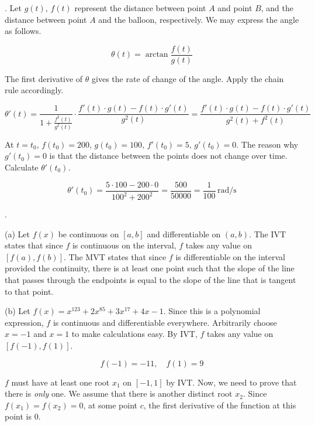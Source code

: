 \documentclass{article}
\begin{document}
\hfill

. Let $g(t),\,f(t)$ represent the distance between point $A$ and point $B$, and the distance between point $A$ and the balloon, respectively. We may express the angle as follows.

\[\theta(t)=\arctan{\frac{f(t)}{g(t)}}\]

\hfill

\noindent The first derivative of $\theta$ gives the rate of change of the angle. Apply the chain rule accordingly.

\[\theta'(t)=\frac1{\displaystyle 1+\frac{f^2(t)}{g^2(t)}}\cdot\frac{f'(t)\cdot g(t) - f(t) \cdot g'(t)}{g^2(t)}=\frac{f'(t)\cdot g(t) - f(t) \cdot g'(t)}{g^2(t)+f^2(t)}\]

\hfill

\noindent At $t=t_0$, $f(t_0)= 200,\,g(t_0) =100,\,f'(t_0)=5,\,g'(t_0) = 0$. The reason why $g'(t_0) = 0$ is that the distance between the points does not change over time. Calculate $\theta'(t_0)$.

\[\theta'(t_0)=\frac{5\cdot 100 - 200 \cdot 0}{100^2+200^2}=\frac{500}{50000}=\boxed{\frac1{100}\,\mathrm{rad/s}} \]

\hfill

.

\hfill

\noindent (a) Let $f(x)$ be continuous on $[a,b]$ and differentiable on $(a,b)$. The IVT states that since $f$ is continuous on the interval, $f$ takes any value on $[f(a), f(b)]$. The MVT states that since $f$ is differentiable on the interval provided the continuity, there is at least one point such that the slope of the line that passes through the endpoints is equal to the slope of the line that is tangent to that point.

\hfill

\noindent (b) Let $f(x) = x^{123}+2x^{85} + 3x^{17} + 4x-1$. Since this is a polynomial expression, $f$ is continuous and differentiable everywhere. Arbitrarily choose $x=-1$ and $x=1$ to make calculations easy. By IVT, $f$ takes any value on $[f(-1), f(1)]$.

\[f(-1) = -11,\quad f(1) =9\]

\hfill

\noindent $f$ must have at least one root $x_1$ on $[-1, 1]$ by IVT. Now, we need to prove that there is \textit{only} one. We assume that there is another distinct root $x_2$. Since $f(x_1) = f(x_2) = 0$, at some point $c$, the first derivative of the function at this point is $0$.
\end{document}
